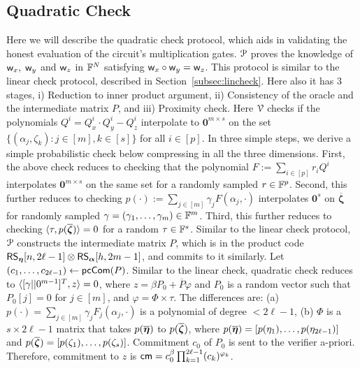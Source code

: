 \subsection{Quadratic Check}\label{subsec:quadcheck}
Here we will describe the quadratic check protocol, which aids in validating the honest evaluation of the circuit's multiplication gates. $\mathcal{P}$ proves the knowledge of $\mathsf{w}_x, \; \mathsf{w}_y$ and $\mathsf{w}_z$ in $\mathbb{F}^N$ satisfying $\mathsf{w}_x \circ \mathsf{w}_y = \mathsf{w}_z$. This protocol is similar to the linear check protocol, described in Section~\ref{subsec:lincheck}. Here also it has 3 stages, i) Reduction to inner product argument, ii) Consistency of the oracle and the intermediate matrix $P$, and iii) Proximity check.
Here $\mathcal{V}$ checks if the polynomials $Q^i = Q^i_x \cdot Q^i_y - Q^i_z$ interpolate to ${\bm 0}^{m \times s}$ on the set $\{(\alpha_j, \zeta_k): j \in [m], k \in [s] \}$ for all $i \in [p]$. In three simple steps, we derive a simple probabilistic check below compressing in all the three dimensions. 
First, the above check reduces to   checking  that the polynomial $F := \sum_{i\in [p]}r_iQ^i$ interpolates $\bm{0}^{m\times s}$ on the same set for a randomly sampled $r\in \mathbb{F}^p$. 
Second, this further reduces to checking $p(\cdot) := \sum_{j\in [m]}\gamma_jF(\alpha_j,\cdot)$ interpolates $\bm{0}^s$ on $\overline{\bm{\zeta}}$ for randomly sampled $\gamma=(\gamma_1,\ldots,\gamma_m)\in \mathbb{F}^m$.
Third, this further reduces to checking $\langle \tau,p(\overline{\bm{\zeta}})\rangle=0$ for a random $\tau\in \mathbb{F}^s$. 
Similar to the linear check protocol, $\mathcal{P}$ constructs the intermediate matrix $P$, which is in the product code $\mathsf{RS}_{\bm{\eta}}[n,2\ell-1]\otimes \mathsf{RS}_{\bm{\alpha}}[h,2m-1]$, and commits to it similarly. Let $(c_1, \ldots, c_{2\ell-1}) \leftarrow \mathsf{pcCom}(P)$. Similar to the linear check, quadratic check reduces to $\langle [\gamma || 0^{m-1}]^T,z\rangle = 0$, where $z = \beta P_0 + \overline{P} \varphi$ and $P_0$ is a random vector such that $P_0[j] = 0$ for $j \in [m]$, and $\varphi = \Phi \times \tau$. The differences are: (a) $p(\cdot) = \sum_{j\in[m]}\gamma_j F_j(\alpha_j,\cdot)$ is a polynomial of degree $<2\ell-1$, (b) $\Phi$ is a $s \times 2\ell -1$ matrix that takes $p(\overline{\bm{\eta}})$ to $p(\overline{\bm{\zeta}})$, where $p(\overline{\bm{\eta}}) = [p(\eta_1),\ldots, p(\eta_{2\ell-1})]$ and $p(\overline{\bm{\zeta}}) = [p(\zeta_1),\ldots, p(\zeta_{s})]$. Commitment $c_0$ of $P_0$ is sent to the verifier a-priori. Therefore, commitment to $z$ is $\mathsf{cm} = c_0^{\beta} \prod_{k=1}^{2\ell-1} (c_k)^{\varphi_k}$.

\smallskip

